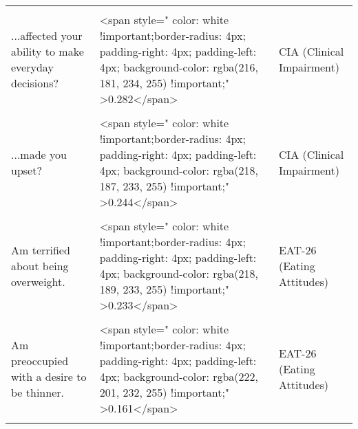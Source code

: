 \documentclass[border=1mm]{standalone}
\begin{document}
\begin{longtable}{lll}
\cellcolor{gray!10}{...made you forgetful?} & \cellcolor{gray!10}{<span style="     color: white !important;border-radius: 4px; padding-right: 4px; padding-left: 4px; background-color: rgba(211, 166, 235, 255) !important;" >0.367</span>} & \cellcolor{gray!10}{CIA (Clinical Impairment)}\\
...affected your ability to make everyday decisions? & <span style="     color: white !important;border-radius: 4px; padding-right: 4px; padding-left: 4px; background-color: rgba(216, 181, 234, 255) !important;" >0.282</span> & CIA (Clinical Impairment)\\
\cellcolor{gray!10}{...interfered with meals with family or friends?} & \cellcolor{gray!10}{<span style="     color: white !important;border-radius: 4px; padding-right: 4px; padding-left: 4px; background-color: rgba(216, 180, 234, 255) !important;" >0.287</span>} & \cellcolor{gray!10}{CIA (Clinical Impairment)}\\
\addlinespace
...made you upset? & <span style="     color: white !important;border-radius: 4px; padding-right: 4px; padding-left: 4px; background-color: rgba(218, 187, 233, 255) !important;" >0.244</span> & CIA (Clinical Impairment)\\
\cellcolor{gray!10}{...made you feel ashamed of yourself?} & \cellcolor{gray!10}{<span style="     color: white !important;border-radius: 4px; padding-right: 4px; padding-left: 4px; background-color: rgba(221, 196, 232, 255) !important;" >0.191</span>} & \cellcolor{gray!10}{CIA (Clinical Impairment)}\\
Am terrified about being overweight. & <span style="     color: white !important;border-radius: 4px; padding-right: 4px; padding-left: 4px; background-color: rgba(218, 189, 233, 255) !important;" >0.233</span> & EAT-26 (Eating Attitudes)\\
\cellcolor{gray!10}{Feel extremely guilty after eating.} & \cellcolor{gray!10}{<span style="     color: white !important;border-radius: 4px; padding-right: 4px; padding-left: 4px; background-color: rgba(212, 168, 235, 255) !important;" >0.357</span>} & \cellcolor{gray!10}{EAT-26 (Eating Attitudes)}\\
Am preoccupied with a desire to be thinner. & <span style="     color: white !important;border-radius: 4px; padding-right: 4px; padding-left: 4px; background-color: rgba(222, 201, 232, 255) !important;" >0.161</span> & EAT-26 (Eating Attitudes)\\
\addlinespace
\cellcolor{gray!10}{Think about burning up calories when I exercise.} & \cellcolor{gray!10}{<span style="     color: white !important;border-radius: 4px; padding-right: 4px; padding-left: 4px; background-color: rgba(218, 189, 233, 255) !important;" >0.234</span>} & \cellcolor{gray!10}{EAT-26 (Eating Attitudes)}\\

\end{longtable}
\end{document}
